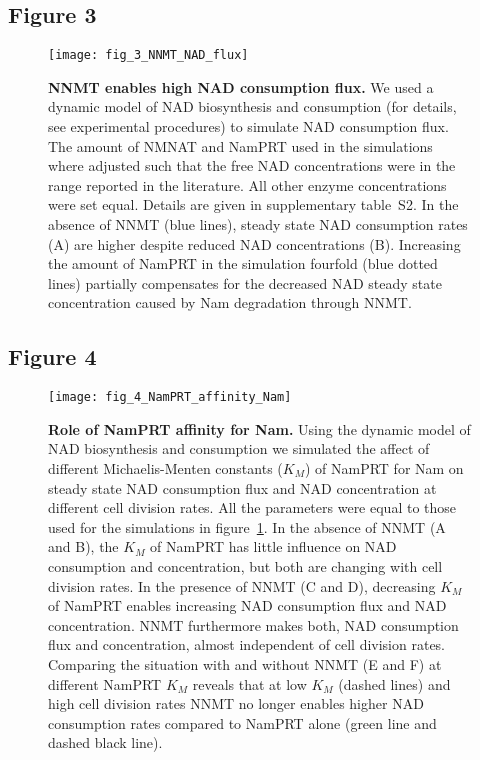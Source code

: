 \newpage


\subsection{Figure 3}

\begin{figure}[ht]
  \centering
  \texttt{[image: fig\_3\_NNMT\_NAD\_flux]}
  \caption{\textbf{NNMT enables high NAD consumption flux.} We used a dynamic model of NAD biosynthesis and consumption (for details, see experimental procedures) to simulate NAD consumption flux. The amount of NMNAT and NamPRT used in the simulations where adjusted such that the free NAD concentrations were in the range reported in the literature. All other enzyme concentrations were set equal. Details are given in supplementary table~S2. In the absence of NNMT (blue lines), steady state NAD consumption rates (A) are higher despite reduced NAD concentrations (B). Increasing the amount of NamPRT in the simulation fourfold (blue dotted lines) partially compensates for the decreased NAD steady state concentration caused by Nam degradation through NNMT.}
  \label{fig:NNMT_NAD_flux}
\end{figure}

\newpage


\subsection{Figure 4}

\begin{figure}[ht]
  \centering
  \texttt{[image: fig\_4\_NamPRT\_affinity\_Nam]}
  \caption{\textbf{Role of NamPRT affinity for Nam.} Using the dynamic model of NAD biosynthesis and consumption we simulated the affect of different Michaelis-Menten constants ($K_{M}$) of NamPRT for Nam on steady state NAD consumption flux and NAD concentration at different cell division rates. All the parameters were equal to those used for the simulations in figure~\ref{fig:NNMT_NAD_flux}. In the absence of NNMT (A and B), the $K_{M}$ of NamPRT has little influence on NAD consumption and concentration, but both are changing with cell division rates. In the presence of NNMT (C and D), decreasing $K_{M}$ of NamPRT enables increasing NAD consumption flux and NAD concentration. NNMT furthermore makes both, NAD consumption flux and concentration, almost independent of cell division rates. Comparing the situation with and without NNMT (E and F) at different NamPRT $K_{M}$ reveals that at low $K_{M}$ (dashed lines) and high cell division rates NNMT no longer enables higher NAD consumption rates compared to NamPRT alone (green line and dashed black line).}
  \label{fig:NamPRT_affinity_Nam}
\end{figure}

